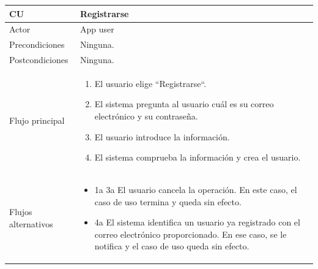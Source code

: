 \documentclass[twoside]{report}
\newcommand\addrow[2]{#1 &#2\\ }
\newcommand\addheading[2]{#1 &#2\\ \hline}
\newcommand\tabularhead{\begin{tabular}{lp{0.7\textwidth}}
\hline
}
\newenvironment{usecase}{\tabularhead}
{\hline\end{tabular}}
\begin{document}
\vspace{0.5cm}

\begin{usecase}
  \addheading{\textbf{CU\arabic{usecase}}}{Registrarse} 
  \addrow{Actor}{App user}
  \addrow{Precondiciones}{Ninguna.}
  \addrow{Postcondiciones}{Ninguna.}
  \addrow{Flujo principal}{
  		\begin{enumerate}
  		\item El usuario elige “Registrarse“. %
  		\item El sistema pregunta al usuario cuál es su correo electrónico y su contraseña. %
  		\item El usuario introduce la información. %
  		\item El sistema comprueba la información y crea el usuario. %
  		\end{enumerate}
  }
  \addrow{Flujos alternativos}{
  		\begin{itemize}
  		\item 1a 3a El usuario cancela la operación. En este caso, el caso de uso termina y queda sin efecto.
  		\item 4a El sistema identifica un usuario ya registrado con el correo electrónico proporcionado. En ese caso, se le notifica y el caso de uso queda sin efecto.
  		\end{itemize}
  }
\end{usecase}\\

\vspace{0.5cm}
\end{document}
